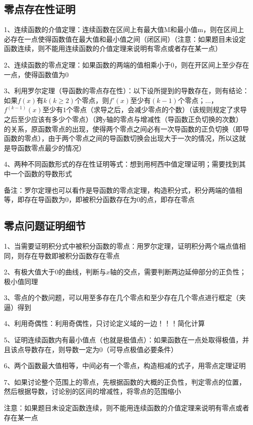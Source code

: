 \subsection{零点存在性证明}

1、连续函数的介值定理：连续函数在区间上有最大值M和最小值m，则在区间上必存在一点使得函数值在最大值和最小值之间（闭区间）（注意：如果题目未设定函数连续，则不能用连续函数的介值定理来说明有零点或者存在某一点）

2、连续函数的零点定理：如果函数的两端的值相乘小于0，则在开区间上至少存在一点，使得函数值为0

3、利用罗尔定理（导函数的零点存在性）：以下设所提到的导数存在，则有结论：如果$f(x)$有$k(k≥2)$个零点，则$f'(x)$至少有$(k-1)$个零点；$…$，$f^{(k-1)}(x)$至少有$1$个零点（求导之后，会减少零点的个数）（该规则规定了求导之后至少应该有多少个零点）（跨y轴的零点与增减性（导函数正负切换的次数）的关系，原函数零点的出现，使得两个零点之间必有一次导函数的正负切换（即导函数的零点），由于两个零点之间的导函数切换会出现大于一次的情况，所以这就是导函数零点最少的情况）

4、两种不同函数形式的存在性证明等式：想到用柯西中值定理证明；需要找到其中一个函数的导数形式

备注：罗尔定理也可以看作是导函数的零点定理，构造积分式，积分两端的值相等，即存在导函数为0，即被积分函数存在为0的点，即存在零点



\subsection{零点问题证明细节}

1、当需要证明积分式中被积分函数的零点：用罗尔定理，证明积分两个端点值相同，则存在导数即被积分函数存在零点

2、有极大值大于0的曲线，判断与$x$轴的交点，需要判断两边延伸部分的正负性；极小值同理

3、零点的个数问题，可以用至多存在几个零点和至少存在几个零点进行框定（夹逼）得到

4、利用奇偶性：利用奇偶性，只讨论定义域的一边！！！简化计算

5、证明连续函数内有最小值点（也就是极值点）：如果函数在一点处取得极值，并且该点导数存在，则导数一定为0（可导点极值必要条件）

6、两个函数最大值相等，中间必有一个零点，构造相减的式子，用零点定理证明

7、如果讨论整个范围上的零点，先根据函数的大概的正负性，判定零点的位置，然后根据导数，讨论别的区间的增减性，将零点的范围缩小

注意：如果题目未设定函数连续，则不能用连续函数的介值定理来说明有零点或者存在某一点



